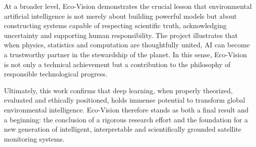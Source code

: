 \documentclass[12pt,a4paper]{report}
\begin{document}
At a broader level, Eco-Vision demonstrates the crucial lesson that environmental artificial intelligence is not merely about building powerful models but about constructing systems capable of respecting scientific truth, acknowledging uncertainty and supporting human responsibility. The project illustrates that when physics, statistics and computation are thoughtfully united, AI can become a trustworthy partner in the stewardship of the planet. In this sense, Eco-Vision is not only a technical achievement but a contribution to the philosophy of responsible technological progress.

Ultimately, this work confirms that deep learning, when properly theorized, evaluated and ethically positioned, holds immense potential to transform global environmental intelligence. Eco-Vision therefore stands as both a final result and a beginning: the conclusion of a rigorous research effort and the foundation for a new generation of intelligent, interpretable and scientifically grounded satellite monitoring systems.

\newpage
\end{document}
